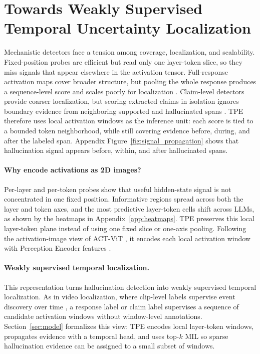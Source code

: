 \section{Towards Weakly Supervised Temporal Uncertainty Localization}
\label{sec:non_static}

Mechanistic detectors face a tension among coverage, localization,
and scalability. Fixed-position probes \citep{azaria2023,orgad2024}
are efficient but read only one layer-token slice, so they miss
signals that appear elsewhere in the activation tensor. Full-response
activation maps cover broader structure, but pooling the whole
response produces a sequence-level score and scales poorly for
localization \citep{barshalom2025}. Claim-level detectors provide
coarser localization, but scoring extracted claims in isolation
ignores boundary evidence from neighboring supported and hallucinated
spans \citep{snyder2024,he2024}. TPE therefore uses local activation
windows as the inference unit: each score is tied to a bounded token
neighborhood, while still covering evidence before, during, and after
the labeled span. Appendix Figure~\ref{fig:signal_propagation} shows
that hallucination signal appears before, within, and after
hallucinated spans.

\paragraph{Why encode activations as 2D images?}
Per-layer and per-token probes show that useful hidden-state signal
is not concentrated in one fixed position. Informative regions spread
across both the layer and token axes, and the most predictive
layer-token cells shift across LLMs, as shown by the heatmaps in
Appendix~\ref{app:heatmaps}. TPE preserves this local layer-token
plane instead of using one fixed slice or one-axis pooling. Following
the activation-image view of ACT-ViT \citep{barshalom2025actvit}, it
encodes each local activation window with Perception Encoder features
\citep{bolya2025perceptionencoder}.

\paragraph{Weakly supervised temporal localization.}
This representation turns hallucination detection into weakly
supervised temporal localization. As in video localization, where
clip-level labels supervise event discovery over time
\citep{pilhyeonlee2021}, a response label or claim label supervises
a sequence of candidate activation windows without window-level
annotations. Section~\ref{sec:model} formalizes this view: TPE
encodes local layer-token windows, propagates evidence with a
temporal head, and uses top-$k$ MIL so sparse hallucination evidence
can be assigned to a small subset of windows.
